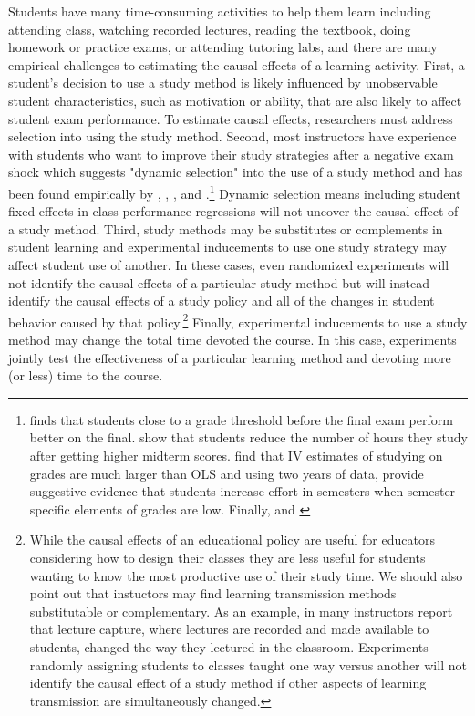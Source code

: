 \documentclass[12pt]{article}
\begin{document}
Students have many time-consuming activities to help them learn including attending class, watching recorded lectures, reading the textbook, doing homework or practice exams, or attending tutoring labs, and there are many empirical challenges to estimating the causal effects of a learning activity. First, a student's decision to use a study method is likely influenced by unobservable student characteristics, such as motivation or ability, that are also likely to affect student exam performance. To estimate causal effects, researchers must address selection into using the study method. Second, most instructors have experience with students who want to improve their study strategies after a negative exam shock which suggests "dynamic selection" into the use of a study method and has been found empirically by \textcite{oettinger2002}, \textcite{ko2005}, \textcite{ss2008},  \textcite{bo2012} and \textcite{bo2015}.\footnote{\textcite{oettinger2002} finds that students close to a grade threshold before the final exam perform better on the final. \textcite{ko2005} show that students reduce the number of hours they study after getting higher midterm scores. \textcite{ss2008} find that IV estimates of studying on grades are much larger than OLS and using two years of data, provide suggestive evidence that students increase effort in semesters when semester-specific elements of grades are low.  Finally, \textcite{bo2012} and \textcite{bo2015} } Dynamic selection means including student fixed effects in class performance regressions will not uncover the causal effect of a study method. Third, study methods may be substitutes or complements in student learning and experimental inducements to use one study strategy may affect student use of another. In these cases, even randomized experiments will not identify the causal effects of a particular study method but will instead identify the causal effects of a study policy and all of the changes in student behavior caused by that policy.\footnote{While the causal effects of an educational policy are useful for educators considering how to design their classes they are less useful for students wanting to know the most productive use of their study time.  We should also point out that instuctors may find learning transmission methods substitutable or complementary.  As an example, in \textcite{msc2019} many instructors report that lecture capture, where lectures are recorded and made available to students, changed the way they lectured in the classroom.  Experiments randomly assigning students to classes taught one way versus another will not identify the causal effect of a study method if other aspects of learning transmission are simultaneously changed.}  Finally, experimental inducements to use a study method may change the total time devoted the course.  In this case, experiments jointly test the effectiveness of a particular learning method and devoting more (or less) time to the course. 
\end{document}
